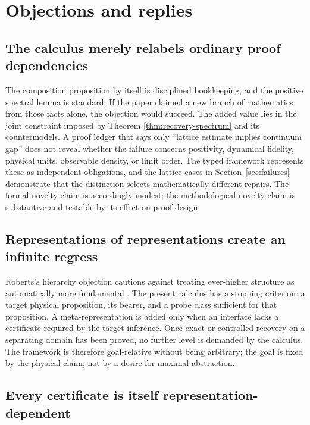 \section{Objections and replies}
\label{sec:objections}

\subsection{The calculus merely relabels ordinary proof dependencies}

The composition proposition by itself is disciplined bookkeeping, and the
positive spectral lemma is standard.  If the paper claimed a new branch of
mathematics from those facts alone, the objection would succeed.  The added
value lies in the joint constraint imposed by Theorem
\ref{thm:recovery-spectrum} and its countermodels.  A proof ledger that says
only ``lattice estimate implies continuum gap'' does not reveal whether the
failure concerns positivity, dynamical fidelity, physical units, observable
density, or limit order.  The typed framework represents these as independent
obligations, and the lattice cases in Section~\ref{sec:failures} demonstrate
that the distinction selects mathematically different repairs.  The formal
novelty claim is accordingly modest; the methodological novelty claim is
substantive and testable by its effect on proof design.

\subsection{Representations of representations create an infinite regress}

Roberts's hierarchy objection cautions against treating ever-higher structure
as automatically more fundamental \cite{Roberts2011}.  The present calculus
has a stopping criterion: a target physical proposition, its bearer, and a
probe class sufficient for that proposition.  A meta-representation is added
only when an interface lacks a certificate required by the target inference.
Once exact or controlled recovery on a separating domain has been proved, no
further level is demanded by the calculus.  The framework is therefore
goal-relative without being arbitrary; the goal is fixed by the physical
claim, not by a desire for maximal abstraction.

\subsection{Every certificate is itself representation-dependent}

